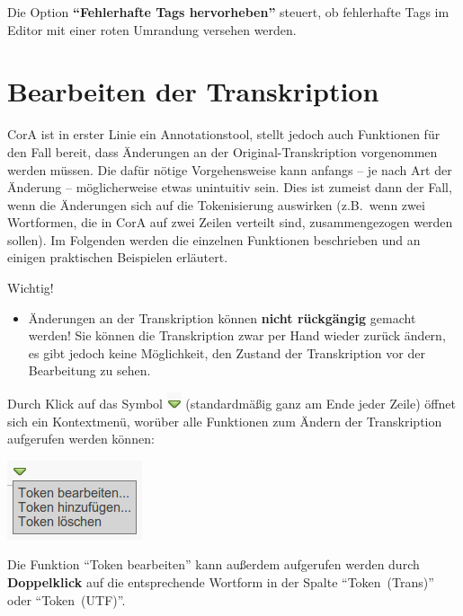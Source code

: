 \documentclass[11pt,a4paper,parskip=half]{scrartcl}
\begin{document}
Die Option \textbf{``Fehlerhafte Tags hervorheben''} steuert, ob
fehlerhafte Tags im Editor mit einer roten Umrandung versehen werden.

\newpage
\section{Bearbeiten der Transkription}
\label{sec:bearbeiten}

CorA ist in erster Linie ein Annotationstool, stellt jedoch auch
Funktionen für den Fall bereit, dass Änderungen an der
Original-Transkription vorgenommen werden müssen.  Die dafür nötige
Vorgehensweise kann anfangs -- je nach Art der Änderung --
möglicherweise etwas unintuitiv sein.  Dies ist zumeist dann der Fall,
wenn die Änderungen sich auf die Tokenisierung auswirken (z.B.\ wenn
zwei Wortformen, die in CorA auf zwei Zeilen verteilt sind,
zusammengezogen werden sollen).  Im Folgenden werden die einzelnen
Funktionen beschrieben und an einigen praktischen Beispielen
erläutert.

\begin{alertbox}{Wichtig!}
  \begin{itemize}\vspace{-1.5em}
  \item Änderungen an der Transkription können \textbf{nicht rückgängig} gemacht
    werden!  Sie können die Transkription zwar per Hand wieder zurück ändern, es
    gibt jedoch keine Möglichkeit, den Zustand der Transkription vor der
    Bearbeitung zu sehen.
  \end{itemize}
\end{alertbox}

Durch Klick auf das
Symbol \includegraphics[height=\baselineskip]{img/dropdown.png}
(standardmäßig ganz am Ende jeder Zeile) öffnet sich ein Kontextmenü,
worüber alle Funktionen zum Ändern der Transkription aufgerufen werden
können:

\begin{center}
  \includegraphics[width=0.25\linewidth]{img/dropdown-menu.png}
\end{center}

Die Funktion "`Token bearbeiten"' kann außerdem aufgerufen werden
durch \textbf{Doppelklick} auf die entsprechende Wortform in der
Spalte "`Token~(Trans)"' oder "`Token~(UTF)"'.
\end{document}
